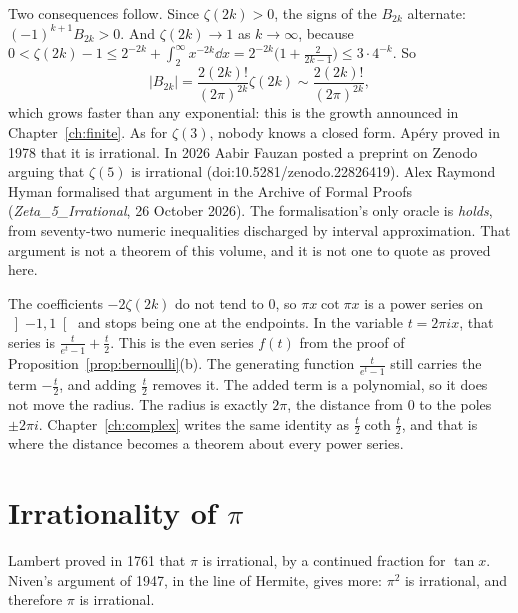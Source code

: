 Two consequences follow. Since $\zeta(2k)>0$, the signs of the $B_{2k}$ alternate: $(-1)^{k+1}B_{2k}>0$. And
$\zeta(2k)\to1$ as $k\to\infty$, because
$0<\zeta(2k)-1\le2^{-2k}+\int_2^\infty x^{-2k}\dd x=2^{-2k}\bigl(1+\frac2{2k-1}\bigr)\le3\cdot4^{-k}$. So
\[
|B_{2k}|=\frac{2(2k)!}{(2\pi)^{2k}}\zeta(2k)\sim\frac{2(2k)!}{(2\pi)^{2k}},
\]
which grows faster than any exponential: this is the growth announced in Chapter~\ref{ch:finite}. As for $\zeta(3)$, nobody knows a closed
form. Ap\'ery proved in 1978 that it is irrational. In 2026 Aabir Fauzan posted a preprint on Zenodo arguing that $\zeta(5)$ is irrational (doi:10.5281/zenodo.22826419). Alex Raymond Hyman formalised that argument in the Archive of Formal Proofs (\emph{Zeta\_5\_Irrational}, 26 October 2026). The formalisation's only oracle is \emph{holds}, from seventy-two numeric inequalities discharged by interval approximation. That argument is not a theorem of this volume, and it is not one to quote as proved here.

\begin{remark}
The coefficients $-2\zeta(2k)$ do not tend to $0$, so $\pi x\cot\pi x$ is a power series on $\left]-1,1\right[$ and stops being one at the endpoints. In the variable $t=2\pi ix$, that series is $\frac t{e^t-1}+\frac t2$. This is the even series $f(t)$ from the proof of Proposition~\ref{prop:bernoulli}(b). The generating function $\frac t{e^t-1}$ still carries the term $-\frac t2$, and adding $\frac t2$ removes it. The added term is a polynomial, so it does not move the radius. The radius is exactly $2\pi$, the distance from $0$ to the poles $\pm2\pi i$. Chapter~\ref{ch:complex} writes the same identity as $\frac t2\coth\frac t2$, and that is where the distance becomes a theorem about every power series.
\end{remark}

\section{Irrationality of \texorpdfstring{$\pi$}{pi}}

Lambert proved in 1761 that $\pi$ is irrational, by a continued fraction for $\tan x$. Niven's argument of 1947, in the line of Hermite, gives more: $\pi^2$ is irrational, and therefore $\pi$ is irrational.

